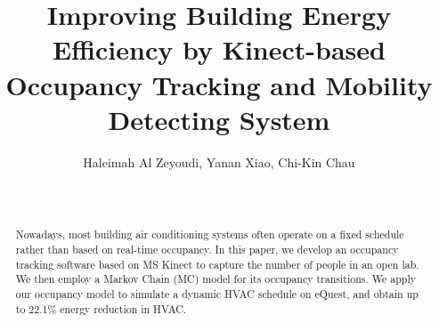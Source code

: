 \documentclass{sig-alternate}
\begin{document}
\title{Improving Building Energy Efficiency by Kinect-based Occupancy
  Tracking and Mobility Detecting System}

  
\author{\alignauthor Haleimah Al Zeyoudi, Yanan Xiao, Chi-Kin Chau \\
  \quad \\  
 \\
} 



\makeatletter
\let\@copyrightspace\relax
\makeatother





\maketitle{}



\begin{abstract}
 Nowadays, most building air conditioning systems often operate on a
 fixed schedule rather than based on real-time occupancy. In this
 paper, we develop an occupancy tracking software based on MS Kinect
 to capture the number of people in an open lab. We then employ a
 Markov Chain (MC) model for its occupancy transitions. We apply our
 occupancy model to simulate a dynamic HVAC schedule on eQuest, and
 obtain up to 22.1\% energy reduction in HVAC.  
\end{abstract}









\end{document}
